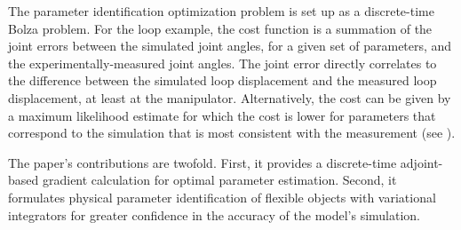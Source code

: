 \documentclass[letterpaper, 10pt, conference]{ieeeconf}
\begin{document}




The parameter identification optimization problem is set up as a discrete-time Bolza problem.  For the loop example, the cost function is a summation of the joint errors between the simulated joint angles, for a given set of parameters, and the experimentally-measured joint angles.  The joint error directly correlates to the difference between the simulated loop displacement and the measured loop displacement, at least at the manipulator.  Alternatively, the cost can be given by a maximum likelihood estimate for which the cost is lower for parameters that correspond to the simulation that is most consistent with the measurement (see \cite{houska_etal}).  

The paper's contributions are twofold.  First, it provides a discrete-time adjoint-based gradient calculation for optimal parameter estimation.  Second, it formulates physical parameter identification of flexible objects with variational integrators for greater confidence in the accuracy of the model's simulation.
\end{document}

